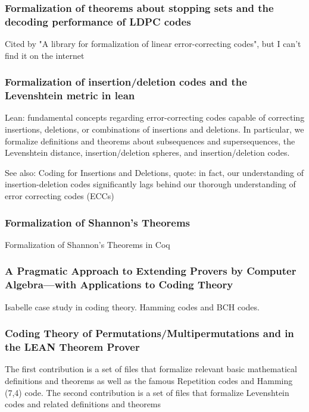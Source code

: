 \documentclass{article}
\begin{document}
\subsubsection{Formalization of theorems about stopping sets and the decoding performance of LDPC codes}

Cited by "A library for formalization of linear error-correcting codes", but I can't find it on the internet

\subsubsection{Formalization of insertion/deletion codes and the Levenshtein metric in lean}

Lean: fundamental concepts regarding error-correcting codes capable of correcting insertions, deletions, or combinations of insertions and deletions. In particular, we formalize definitions and theorems about subsequences and supersequences, the Levenshtein distance, insertion/deletion spheres, and insertion/deletion codes.

See also: Coding for Insertions and Deletions, quote: in fact, our understanding of insertion-deletion codes significantly lags behind our thorough understanding of error correcting codes (ECCs)


\subsubsection{Formalization of Shannon’s Theorems}

Formalization of Shannon's Theorems in Coq

\subsubsection{A Pragmatic Approach to Extending Provers by Computer Algebra—with Applications to Coding Theory}

Isabelle case study in coding theory. Hamming codes and BCH codes.

\subsubsection{Coding Theory of Permutations/Multipermutations and in the LEAN Theorem Prover}

The first contribution is a set of files that formalize relevant basic mathematical definitions and theorems as well as the famous Repetition codes and Hamming (7,4) code. The second contribution is a set of files that formalize Levenshtein codes and related definitions and theorems
\end{document}
